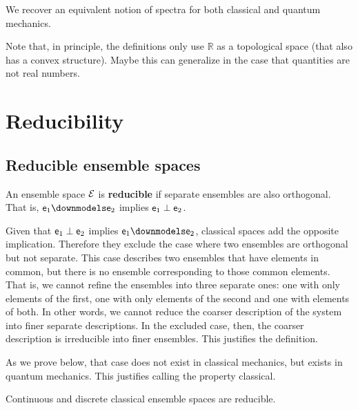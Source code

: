 \begin{prop}
	
\end{prop}

\begin{conj}
	We recover an equivalent notion of spectra for both classical and quantum mechanics.
\end{conj}

Note that, in principle, the definitions only use $\mathbb{R}$ as a topological space (that also has a convex structure). Maybe this can generalize in the case that quantities are not real numbers.

\section{Reducibility}

\subsection{Reducible ensemble spaces}

\begin{defn}
	An ensemble space $\mathcal{E}$ is \textbf{reducible} if separate ensembles are also orthogonal. That is, $\ens_1 \separate \ens_2$ implies $\mathsf{e}_1 \perp \mathsf{e}_2$.
\end{defn}

\begin{justification}
	Given that $\mathsf{e}_1 \perp \mathsf{e}_2$ implies $\ens_1 \separate \ens_2$, classical spaces add the opposite implication. Therefore they exclude the case where two ensembles are orthogonal but not separate. This case describes two ensembles that have elements in common, but there is no ensemble corresponding to those common elements. That is, we cannot refine the ensembles into three separate ones: one with only elements of the first, one with only elements of the second and one with elements of both. In other words, we cannot reduce the coarser description of the system into finer separate descriptions. In the excluded case, then, the coarser description is irreducible into finer ensembles. This justifies the definition.
	
	As we prove below, that case does not exist in classical mechanics, but exists in quantum mechanics. This justifies calling the property classical.
\end{justification}

\begin{prop}
	Continuous and discrete classical ensemble spaces are reducible.
\end{prop}

